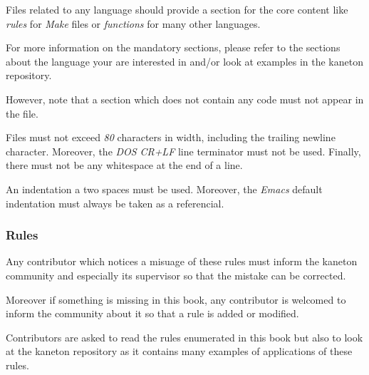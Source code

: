 Files related to any language should provide a section for the core
content like \textit{rules} for \textit{Make} files or \textit{functions}
for many other languages.

For more information on the mandatory sections, please refer to
the sections about the language your are interested in and/or look at
examples in the kaneton repository.

However, note that a section which does not contain any code must not
appear in the file.

Files must not exceed \textit{80} characters in width, including
the trailing newline character. Moreover, the \textit{DOS} \textit{CR+LF}
line terminator must not be used. Finally, there must not be any whitespace
at the end of a line.

An indentation a two spaces must be used. Moreover, the \textit{Emacs}
default indentation must always be taken as a referencial.


\subsubsection{Rules}

Any contributor which notices a misuage of these rules must inform the
kaneton community and especially its supervisor so that the mistake can be
corrected.

Moreover if something is missing in this book, any contributor is welcomed
to inform the community about it so that a rule is added or modified.

Contributors are asked to read the rules enumerated in this book but also
to look at the kaneton repository as it contains many examples of applications
of these rules.
